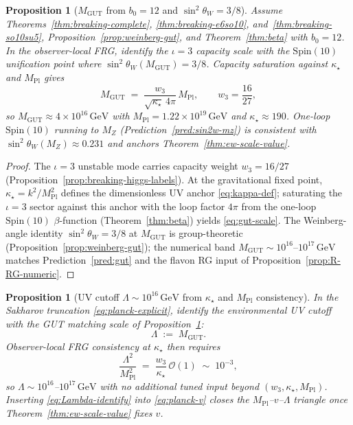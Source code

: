 \documentclass[aps,prd,onecolumn,amsmath,amssymb,nofootinbib,11pt]{revtex4-2}
\numberwithin{equation}{section}
\theoremstyle{plain}
\newtheorem{proposition}[theorem]{Proposition}
\theoremstyle{definition}
\theoremstyle{remark}
\newcommand{\Spin}{\mathrm{Spin}}
\newcommand{\MPl}{M_{\mathrm{Pl}}}
\begin{document}
\begin{proposition}[$M_{\mathrm{GUT}}$ from $b_0=12$ and $\sin^2\theta_W=3/8$]
\label{prop:gut-scale}
Assume Theorems~\ref{thm:breaking-complete},
\ref{thm:breaking-e6so10}, and~\ref{thm:breaking-so10su5},
Proposition~\ref{prop:weinberg-gut}, and Theorem~\ref{thm:beta} with
$b_0=12$. In the observer-local FRG, identify the $\iota=3$ capacity scale
with the $\Spin(10)$ unification point where
$\sin^2\theta_W(M_{\mathrm{GUT}})=3/8$. Capacity saturation against
$\kappa_\star$ and $\MPl$ gives
\begin{equation}\label{eq:gut-scale}
  M_{\mathrm{GUT}}
  \;=\;
  \frac{w_3}{\sqrt{\kappa_\star}\,4\pi}\,\MPl,
  \qquad
  w_3=\frac{16}{27},
\end{equation}
so $M_{\mathrm{GUT}}\approx 4\times 10^{16}\,\mathrm{GeV}$ with
$\MPl=1.22\times 10^{19}\,\mathrm{GeV}$ and $\kappa_\star\approx 190$.
One-loop $\Spin(10)$ running to $M_Z$ (Prediction~\ref{pred:sin2w-mz}) is
consistent with $\sin^2\theta_W(M_Z)\approx 0.231$ and anchors
Theorem~\ref{thm:ew-scale-value}.
\end{proposition}

\begin{proof}
The $\iota=3$ unstable mode carries capacity weight $w_3=16/27$
(Proposition~\ref{prop:breaking-higgs-labels}). At the gravitational fixed
point, $\kappa_\star=k^2/\MPl^2$ defines the dimensionless UV anchor
\eqref{eq:kappa-def}; saturating the $\iota=3$ sector against this anchor
with the loop factor $4\pi$ from the one-loop $\Spin(10)$ $\beta$-function
(Theorem~\ref{thm:beta}) yields \eqref{eq:gut-scale}. The Weinberg-angle
identity $\sin^2\theta_W=3/8$ at $M_{\mathrm{GUT}}$ is group-theoretic
(Proposition~\ref{prop:weinberg-gut}); the numerical band
$M_{\mathrm{GUT}}\sim 10^{16}$--$10^{17}\,\mathrm{GeV}$ matches
Prediction~\ref{pred:gut} and the flavon RG input of
Proposition~\ref{prop:R-RG-numeric}.
\end{proof}

\begin{proposition}[UV cutoff $\Lambda\sim 10^{16}\,\mathrm{GeV}$ from
$\kappa_\star$ and $\MPl$ consistency]
\label{prop:lambda-gut}
In the Sakharov truncation \eqref{eq:planck-explicit}, identify the
environmental UV cutoff with the GUT matching scale of
Proposition~\ref{prop:gut-scale}:
\begin{equation}\label{eq:Lambda-identify}
  \Lambda \;:=\; M_{\mathrm{GUT}}.
\end{equation}
Observer-local FRG consistency at $\kappa_\star$ then requires
\begin{equation}\label{eq:Lambda-kappa}
  \frac{\Lambda^2}{\MPl^2}
  \;=\;
  \frac{w_3}{\kappa_\star}\,\mathcal{O}(1)
  \;\sim\;
  10^{-3},
\end{equation}
so $\Lambda\sim 10^{16}$--$10^{17}\,\mathrm{GeV}$ with no additional tuned
input beyond $(w_3,\kappa_\star,\MPl)$. Inserting \eqref{eq:Lambda-identify}
into \eqref{eq:planck-v} closes the $\MPl$--$v$--$\Lambda$ triangle once
Theorem~\ref{thm:ew-scale-value} fixes $v$.
\end{proposition}
\end{document}
